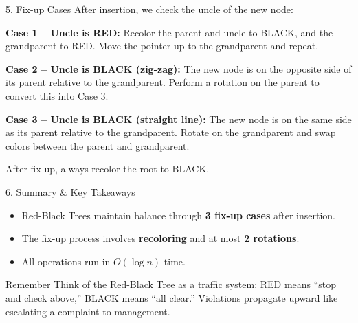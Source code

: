 \documentclass{beamer}
\begin{document}
\begin{frame}{5. Fix-up Cases}
After insertion, we check the uncle of the new node:

\textbf{Case 1 -- Uncle is RED:}
Recolor the parent and uncle to BLACK, and the grandparent to RED. Move the pointer up to the grandparent and repeat.

\textbf{Case 2 -- Uncle is BLACK (zig-zag):}
The new node is on the opposite side of its parent relative to the grandparent. Perform a rotation on the parent to convert this into Case 3.

\textbf{Case 3 -- Uncle is BLACK (straight line):}
The new node is on the same side as its parent relative to the grandparent. Rotate on the grandparent and swap colors between the parent and grandparent.

\vspace{0.5em}
After fix-up, always recolor the root to BLACK.
\end{frame}

\begin{frame}{6. Summary \& Key Takeaways}
\begin{itemize}
    \item Red-Black Trees maintain balance through \textbf{3 fix-up cases} after insertion.
    \item The fix-up process involves \textbf{recoloring} and at most \textbf{2 rotations}.
    \item All operations run in $O(\log n)$ time.
\end{itemize}

\begin{block}{Remember}
Think of the Red-Black Tree as a traffic system: RED means ``stop and check above,'' BLACK means ``all clear.'' Violations propagate upward like escalating a complaint to management.
\end{block}
\end{frame}
\end{document}
